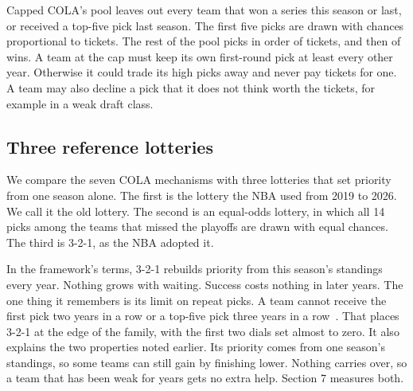 \documentclass[11pt,letterpaper]{article}
\begin{document}
Capped COLA's pool leaves out every team that won a series this season or last, or received a top-five pick last season. The first five picks are drawn with chances proportional to tickets. The rest of the pool picks in order of tickets, and then of wins. A team at the cap must keep its own first-round pick at least every other year. Otherwise it could trade its high picks away and never pay tickets for one. A team may also decline a pick that it does not think worth the tickets, for example in a weak draft class.

\subsection{Three reference lotteries}

We compare the seven COLA mechanisms with three lotteries that set priority from one season alone. The first is the lottery the NBA used from 2019 to 2026. We call it the old lottery. The second is an equal-odds lottery, in which all 14 picks among the teams that missed the playoffs are drawn with equal chances. The third is 3-2-1, as the NBA adopted it.

In the framework's terms, 3-2-1 rebuilds priority from this season's standings every year. Nothing grows with waiting. Success costs nothing in later years. The one thing it remembers is its limit on repeat picks. A team cannot receive the first pick two years in a row or a top-five pick three years in a row~\cite{oconnor2026lottery}. That places 3-2-1 at the edge of the family, with the first two dials set almost to zero. It also explains the two properties noted earlier. Its priority comes from one season's standings, so some teams can still gain by finishing lower. Nothing carries over, so a team that has been weak for years gets no extra help. Section 7 measures both.
\end{document}
